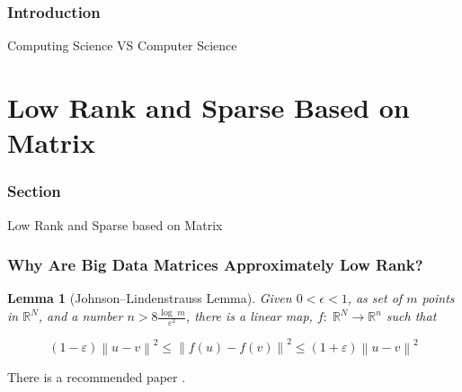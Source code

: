 \documentclass[aspectratio=2516]{beamer}
\newtheorem{lma}{Lemma}
\begin{document}
\begin{frame}

\frametitle{Introduction}
 
 \begin{center}
 	\color{blue} \Large Computing Science VS Computer Science
 \end{center}

\end{frame}

\section{Low Rank and Sparse Based on Matrix}

\begin{frame}
\frametitle{ Section \uppercase\expandafter{}}


\begin{center}
	\Large Low Rank and Sparse based on Matrix
\end{center}

\end{frame}


\begin{frame}

\frametitle{\small Why Are Big Data Matrices Approximately Low Rank? }

\begin{lma}[Johnson--Lindenstrauss Lemma]
	Given $ 0 < \epsilon < 1 $, as set of $ m  $ points in $ \mathbb{R}^{N} $, and a number $n > 8\frac{{\log \;m}}{{{\varepsilon ^2}}}$, there is a linear map, $f:\;{\mathbb{R}^N} \to {\mathbb{R}^n}$ such that 
	
	\begin{equation}
	\left( {1 - \varepsilon } \right){\left\| {u - v} \right\|^2} \leqslant {\left\| {f\left( u \right) - f\left( v \right)} \right\|^2} \leqslant \left( {1 + \varepsilon } \right){\left\| {u - v} \right\|^2}
	\end{equation}
	
\end{lma}

\vspace{1cm}

There is a recommended paper {\color{blue} \cite{p1}}.

\end{frame}
\end{document}
